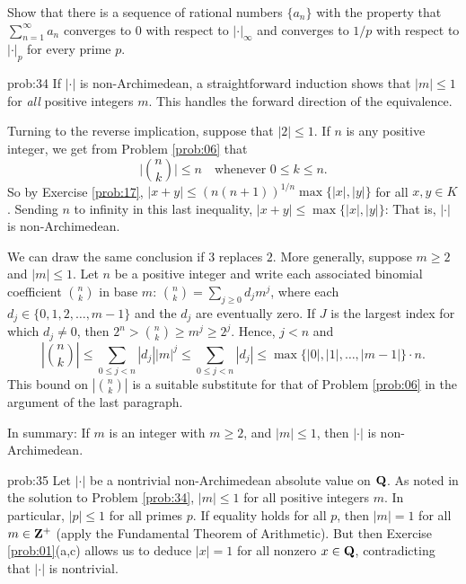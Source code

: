  \begin{challenge} Show that there is a sequence of rational numbers $\{a_n\}$ with the property that $\sum_{n=1}^{\infty} a_n$ converges to $0$ with respect to $|\cdot|_{\infty}$ and converges to $1/p$ with respect to $|\cdot|_p$ for every prime $p$.
\end{challenge} 

\begin{sol}{prob:34} If $|\cdot|$ is non-Archimedean, a straightforward induction shows that $|m| \le 1$ for \emph{all} positive integers $m$. This handles the forward direction of the equivalence.

Turning to the reverse implication, suppose that $|2| \le 1$. If $n$ is any positive integer, we get from Problem \ref{prob:06} that
\[ \bigg|\binom{n}{k}\bigg| \le n \quad\text{whenever $0\le k \le n$}. \] So by Exercise \ref{prob:17}, $|x+y| \le (n(n+1))^{1/n} \max\{|x|,|y|\}$ for all $x,y \in K$. Sending $n$ to infinity in this last inequality, $|x+y| \le \max\{|x|,|y|\}$: That is, $|\cdot|$ is non-Archimedean.

We can draw the same conclusion if $3$ replaces $2$. More generally, suppose $m\ge 2$ and $|m|\le 1$. Let $n$ be a positive integer and write each associated binomial coefficient $\binom{n}{k}$ in base $m$: $\binom{n}{k} = \sum_{j \ge 0} d_j m^j$, where each $d_j \in \{0,1,2,\dots,m-1\}$ and the $d_j$ are eventually zero. If $J$ is the largest index for which $d_j \ne 0$, then $2^n > \binom{n}{k} \ge m^j \ge 2^j$. Hence, $j< n$ and
\[ \left|\binom{n}{k}\right| \le \sum_{0 \le j < n} |d_j| |m|^j \le \sum_{0 \le j < n} |d_j| \le \max\{|0|, |1|, \dots, |m-1|\} \cdot n. \]
This bound on $|\binom{n}{k}|$ is a suitable substitute for that of Problem \ref{prob:06} in the argument of the last paragraph.

In summary: If $m$ is an integer with $m\ge 2$, and $|m|\le 1$, then $|\cdot|$ is non-Archimedean.
\end{sol}

\begin{sol}{prob:35} Let $|\cdot|$ be a nontrivial non-Archimedean absolute value on $\mathbf{Q}$. As noted in the solution to Problem \ref{prob:34}, $|m| \le 1$ for all positive integers $m$. In particular, $|p|\le 1$ for all primes $p$. If equality holds for all $p$, then $|m| = 1$ for all $m\in \mathbf{Z}^{+}$ (apply the Fundamental Theorem of Arithmetic). But then Exercise \ref{prob:01}(a,c) allows us to deduce $|x|=1$ for all nonzero $x \in \mathbf{Q}$, contradicting that $|\cdot|$ is nontrivial.
\end{sol}
 

